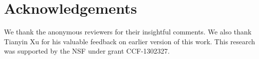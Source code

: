 
\section*{Acknowledgements}

We thank the anonymous reviewers for their insightful comments.
We also thank Tianyin Xu for his valuable feedback
on earlier version of this work.
This research was supported by the NSF under grant CCF-1302327.
